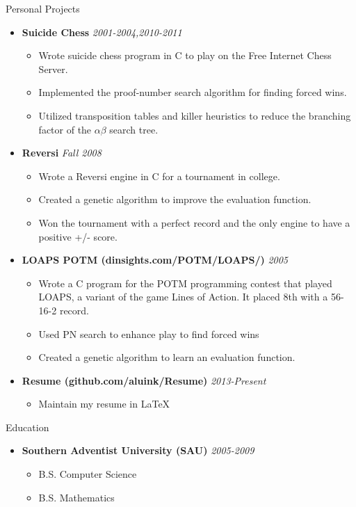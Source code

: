 \documentclass[11pt,oneside]{article}
\newenvironment{ressection}[1]{
	\vspace{4pt}
	{\fontfamily{phv}\selectfont\Large#1}
	\begin{itemize}
	\vspace{3pt}
}{
	\end{itemize}
}
\newcommand{\resitem}[1]{
	\vspace{-4pt}
	\item \begin{flushleft} #1 \end{flushleft}
}
\newcommand{\ressubitem}[1]{
	\vspace{-1pt}
	\item \begin{flushleft} #1 \end{flushleft}
}
\newcommand{\resbigitemb}[2]{
	\vspace{-5pt}
	\item{\textbf{#1} \hfill \textit{#2}}
}
\newenvironment{resdateditem}[2]{
	\resbigitemb{#1}{#2}
	\vspace{-2pt}
	\begin{itemize}
}{
	\end{itemize}
}
\begin{document}
\begin{ressection}{Personal Projects}
  \begin{resdateditem}{Suicide Chess}{2001-2004,2010-2011}
    \ressubitem{Wrote suicide chess program in C to play on the Free Internet Chess Server.}
    \ressubitem{Implemented the proof-number search algorithm for finding forced wins.}
    \ressubitem{Utilized transposition tables and killer heuristics to reduce the branching factor of the $\alpha\beta$ search tree.}
  \end{resdateditem}

  \begin{resdateditem}{Reversi}{Fall 2008}
    \ressubitem{Wrote a Reversi engine in C for a tournament in college.}
		\ressubitem{Created a genetic algorithm to improve the evaluation function.}
		\ressubitem{Won the tournament with a perfect record and the only engine to have a positive +/- score.}
  \end{resdateditem}

  \begin{resdateditem}{LOAPS POTM (dinsights.com/POTM/LOAPS/)}{2005}
    \ressubitem{Wrote a C program for the POTM programming contest that
    played LOAPS, a variant of the game Lines of Action.  It placed 8th
    with a 56-16-2 record.}
    \ressubitem{Used PN search to enhance play to find forced wins}
    \ressubitem{Created a genetic algorithm to learn an evaluation function.}
  \end{resdateditem}

  \begin{resdateditem}{Resume (github.com/aluink/Resume)}{2013-Present}
	\ressubitem{Maintain my resume in \LaTeX}
  \end{resdateditem}
\end{ressection}

\begin{ressection}{Education}
	\begin{resdateditem}{Southern Adventist University (SAU)}{2005-2009}
		\resitem{B.S. Computer Science}
		\resitem{B.S. Mathematics}
	\end{resdateditem}
\end{ressection}
\end{document}
